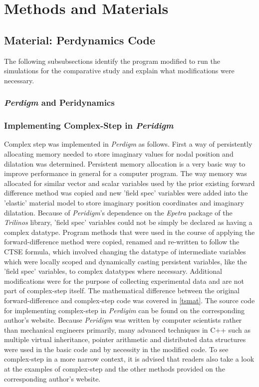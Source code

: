 \documentclass[preprint,12pt]{elsarticle}
\begin{document}
\section{Methods and Materials} 

\subsection{Material: Perdynamics Code}

The following subsubsections identify the program modified to run the simulations for the
comparative study and explain what modifications were necessary.

\subsubsection{\emph{Perdigm} and Peridynamics} 
\subsubsection{Implementing Complex-Step in \emph{Peridigm}} 

Complex step was implemented in \emph{Perdigm} as follows. First a way of persistently allocating
memory needed to store imaginary values for nodal position and dilatation was determined. Persistent
memory allocation is a very basic way to improve performance in general for a computer program. The
way memory was allocated for similar vector and scalar variables used by the prior existing forward
difference method was copied and new 'field spec' variables were added into the 'elastic' material
model to store imaginary position coordinates and imaginary dilatation. Because of \emph{Peridigm}'s
dependence on the \emph{Epetra} package of the \emph{Trilinos} library, 'field spec' variables could
not be simply be declared as having a complex datatype. Program methods that were used in the
course of applying the forward-difference method were copied, renamed and re-written to follow the
CTSE formula, which involved changing the datatype of intermediate variables which were locally
scoped and dynamically casting persistent variables, like the 'field spec' variables, to complex
datatypes where necessary. Additional modifications were for the purpose of collecting experimental
data and are not part of complex-step itself. The mathematical difference between the original
forward-difference and complex-step code was covered in \ref{tsmat}. The source code for
implementing complex-step in \emph{Perdigim} can be found on the corresponding author's website.
Because \emph{Peridigm} was written by computer scientists rather than mechanical engineers
primarily, many advanced techniques in C++ such as multiple virtual inheritance, pointer arithmetic
and distributed data structures were used in the basic code and by necessity in the modified code.
To see complex-step in a more narrow context, it is advised that readers also take a look at the
examples of complex-step and the other methods provided on the corresponding author's website.
\end{document}

